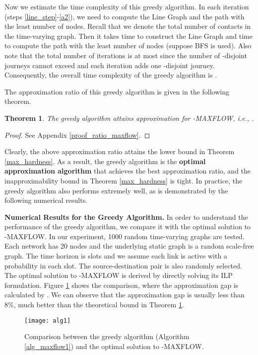 \documentclass[10pt, conference, letterpaper]{IEEEtran}
\newtheorem{theorem}{Theorem}
\begin{document}
Now we estimate the time complexity of this greedy algorithm. In each iteration (steps \ref{line_step}-\ref{a2}), we need to compute the Line Graph and the path with the least number of nodes. Recall that we denote  the total number of contacts in the time-varying graph. Then it takes  time to construct the Line Graph and  time to compute the path with the least number of nodes (suppose BFS is used). Also note that the total number of iterations is at most  since the number of -disjoint journeys cannot exceed  and each iteration adds one -disjoint journey. Consequently, the overall time complexity of the greedy algorithm is .

The approximation ratio of this greedy algorithm is given in the following theorem.


\begin{theorem}\label{ratio_maxflow}
The greedy algorithm  attains  approximation for -MAXFLOW, i.e., .
\end{theorem}
\begin{proof}
See Appendix \ref{proof_ratio_maxflow}.
\end{proof}

\noindent Clearly, the above approximation ratio attains the lower bound in Theorem \ref{max_hardness}. As a result, the greedy algorithm is the \textbf{optimal approximation algorithm} that achieves the best approximation ratio, and the inapproximability bound in Theorem \ref{max_hardness} is tight. In practice, the greedy algorithm also performs extremely well, as is demonstrated by the following numerical results.

\vspace{1mm}

\noindent \textbf{Numerical Results for the Greedy Algorithm.} In order to understand the performance of the greedy algorithm, we compare it with the optimal solution to -MAXFLOW. In our experiment, 1000 random time-varying graphs are tested. Each network has 20 nodes and the underlying static graph is a random scale-free graph. The time horizon is  slots and we assume each link is active with a probability  in each slot. The source-destination pair is also randomly selected. The optimal solution to -MAXFLOW is derived by directly solving its ILP formulation. Figure \ref{gap_maxflow} shows the comparison, where the approximation gap is calculated by . We can observe that the approximation gap is usually less than 8\%, much better than the theoretical bound in Theorem \ref{ratio_maxflow}.

\begin{figure}[ht]
\begin{center}
\texttt{[image: alg1]}
\caption{Comparison between the greedy algorithm (Algorithm \ref{alg_maxflow1}) and the optimal solution to -MAXFLOW.}
\label{gap_maxflow}\vspace{-3mm}
\end{center}
\end{figure}
\end{document}
